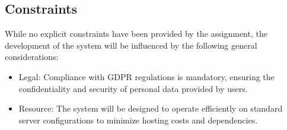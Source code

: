 \subsection{Constraints}
\label{subsec:constraints}%
While no explicit constraints have been provided by the assignment, the development of the system will be influenced by the following general considerations:
\begin{itemize}
    \item Legal: Compliance with GDPR regulations is mandatory, ensuring the confidentiality and security of personal data provided by users.
    \item Resource: The system will be designed to operate efficiently on standard server configurations to minimize hosting costs and dependencies.
\end{itemize}